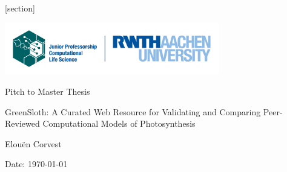 \setlength{\fboxrule}{0.4pt}

[section] \setcounter{theo}{0}
\renewcommand{\thetheo}{\arabic{section}.\arabic{theo}}
\newenvironment{theo}[2][]{%
\refstepcounter{theo}%
\ifstrempty{#1}%
{\mdfsetup{%
frametitle={%
\tikz[baseline=(current bounding box.east),outer sep=0pt]
\node[anchor=east,rectangle,fill=Emerald!20]
{\strut Example~\thetheo};}}
}%
{\mdfsetup{%
frametitle={%
\tikz[baseline=(current bounding box.east),outer sep=0pt]
\node[anchor=east,rectangle,fill=Blue]
{\strut \textcolor{white}{Example~\thetheo:~#1}};}}%
}%
\mdfsetup{innertopmargin=10pt,linecolor=Emerald,%
linewidth=2pt,topline=true,%
frametitleaboveskip=\dimexpr-\ht\strutbox\relax
}
\begin{mdframed}[]\relax%
\label{#2}}{\end{mdframed}}

\thispagestyle{empty}

\vspace*{-5\baselineskip}
\hspace*{0.4\textwidth}\includegraphics[width=0.7\textwidth]{Figures/rwth_jp_computational_life_science_en_rgb.png}\\\vspace{1.5cm}


\vfill


\begin{center}
\Large{Pitch to Master Thesis}\\
\begin{bfseries}
    \begin{LARGE}
        GreenSloth: A Curated Web Resource for Validating and Comparing Peer-Reviewed Computational Models of Photosynthesis \par
    \end{LARGE}
    \LARGE{Elou\"en Corvest}\\[1ex]
\end{bfseries}
\large{Date: \today}
\vfill

\end{center}
